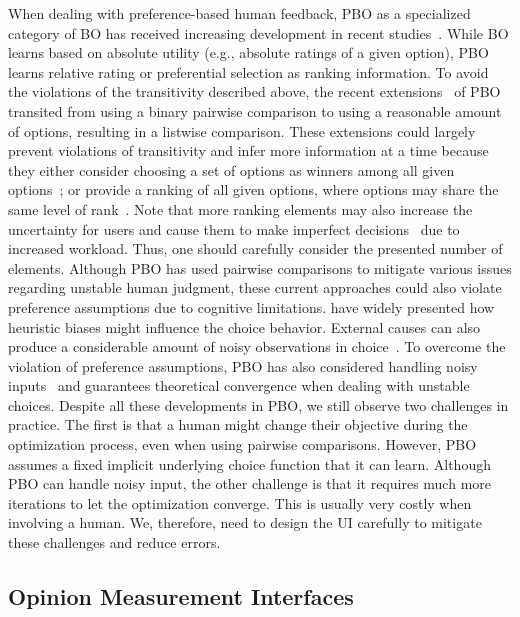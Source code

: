 \documentclass[acmsmall,screen,nonacm]{acmart}
\begin{document}
When dealing with preference-based human feedback,
PBO as a specialized category of BO has received increasing development in recent studies~\cite{gonzalez2017pbo, mikkola2020projective}. While BO learns based on absolute utility (e.g., absolute ratings of a given option), PBO learns relative rating or preferential selection as ranking information. To avoid the violations of the transitivity described above, the recent extensions~\cite{koyama2020sequential, siivola2021preferential, benavoli2021choice} of PBO transited from using a binary pairwise comparison to using a reasonable amount of options, resulting in a listwise comparison. These extensions could largely prevent violations of transitivity and infer more information at a time because they either consider choosing a set of options as winners among all given options~\cite{koyama2020sequential, benavoli2021choice}; or provide a ranking of all given options, where options may share the same level of rank~\cite{siivola2021preferential}. Note that more ranking elements may also increase the uncertainty for users and cause them to make imperfect decisions~\cite{monarch2021hitl} due to increased workload. Thus, one should carefully consider the presented number of elements.
%
Although PBO has used pairwise comparisons to mitigate various issues regarding unstable human judgment, these current approaches could also violate preference assumptions due to cognitive limitations. \citet{tversky1974judgment} have widely presented how heuristic biases might influence the choice behavior. External causes can also produce a considerable amount of noisy observations in choice~\cite{kahneman2021noise}.
%
To overcome the violation of preference assumptions, PBO has also considered handling noisy inputs~\cite{letham2019constrained} and guarantees theoretical convergence when dealing with unstable choices. Despite all these developments in PBO, we still observe two challenges in practice. The first is that a human might change their objective during the optimization process, even when using pairwise comparisons. However, PBO assumes a fixed implicit underlying choice function that it can learn. Although PBO can handle noisy input, the other challenge is that it requires much more iterations to let the optimization converge. This is usually very costly when involving a human. We, therefore, need to design the UI carefully to mitigate these challenges and reduce errors.

\subsection{Opinion Measurement Interfaces}
\end{document}
